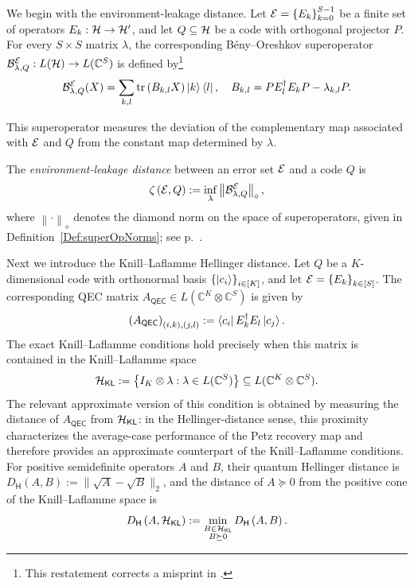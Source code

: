 \documentclass[10pt]{article}
\newcommand{\tr}{\mathrm{tr}}
\newcommand{\C}{\mathbb{C}}
\newcommand{\p}[1]{\left(#1\right)}
\newcommand{\ppp}[1]{\left\{#1\right\}}
\newcommand{\norm}[1]{\left\|#1\right\|}
\newcommand{\s}[1]{\mathsf{#1}}
\begin{document}
We begin with the environment-leakage distance. Let $\calE=\ppp{E_k}_{k=0}^{S-1}$ be a finite set of operators $E_k:{\cal H}\to{\cal H}'$, and let $Q\subseteq{\cal H}$ be a code with orthogonal projector $P$. For every $S\times S$ matrix $\lambda$, the corresponding B\'eny--Oreshkov superoperator $\calB^{\calE}_{\lambda,Q}:L(\calH)\to L(\C^S)$ is defined by\footnote{{This restatement corrects a misprint in \cite[Corollary~2]{beny2010general}.}}
\begin{equation}
\calB^{\calE}_{\lambda,Q}(X)= \sum_{k,l}\tr\p{B_{k,l}X}\ket{k}\bra{l}, \quad B_{k,l} = PE_l^\dag E_k P-\lambda_{k,l}P.
\label{eq:BO_superoperator} 
\end{equation}

This superoperator measures the deviation of the complementary map associated with ${\cal E}$ and $Q$ from the constant map determined by $\lambda$.

\begin{definition} \label{def:environment_leakage_distance}
The \emph{environment-leakage distance} between an error set ${\cal E}$ and a code $Q$ is
\begin{equation}
\zeta\p{\calE,Q} := \inf_{\lambda}\norm{\calB^{\calE}_{\lambda,Q}}_{\diamond},
\label{eq:environment_leakage_distance}
\end{equation}
where $\norm{\cdot}_{\diamond}$ denotes the diamond norm  on the space of superoperators, given in Definition~\ref{Def:superOpNorms}; see p.~\pageref{Def:superOpNorms}.
\end{definition}

Next we introduce the Knill--Laflamme Hellinger distance. Let $Q$ be a $K$-dimensional code with orthonormal basis $\ppp{\ket{c_i}}_{i\in[K]}$, and let $\calE=\ppp{E_k}_{k\in[S]}$. The corresponding QEC matrix $A_{\s{QEC}}\in L(\C^K\otimes\C^S)$ is given by
\begin{equation}
\p{A_{\s{QEC}}}_{(i,k),(j,l)} := \bra{c_i}E_k^\dag E_l\ket{c_j}. \label{eq:QEC_matrix}
\end{equation}
The exact Knill--Laflamme conditions hold precisely when this matrix is contained in the Knill--Laflamme space
\begin{equation}
\calH_{\s{KL}} := \ppp{I_K\otimes\lambda:\lambda\in L(\C^S)} \subseteq L(\C^K\otimes\C^S). \label{eq:KL_space}
\end{equation}
The relevant approximate version of this condition is obtained by measuring the distance of $A_{\s{QEC}}$ from $\calH_{\s{KL}}$: in the Hellinger-distance sense, this proximity characterizes the average-case performance of the Petz recovery map and therefore provides an approximate counterpart of the Knill--Laflamme conditions. For positive semidefinite operators $A$ and $B$, their quantum Hellinger distance is $D_{\s{H}}\p{A,B} :=
\|\sqrt{A}-\sqrt{B}\|_2$,
and the distance of $A\succeq0$ from the positive cone of the Knill--Laflamme space is
\begin{equation}
D_{\s{H}}\p{A,\calH_{\s{KL}}}
:=
\min_{\substack{B\in\calH_{\s{KL}}\\B\succeq0}}
D_{\s{H}}\p{A,B}.
\label{eq:Hellinger_distance_KL_space}
\end{equation}
\end{document}
